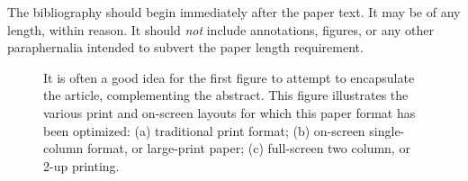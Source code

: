 \documentclass[extendedabs]{recpad2k}
\def\etal{\emph{et al}\bmvaOneDot}
\begin{document}
The bibliography should begin immediately after the paper text.  It may
be of any length, within reason.  It should {\em not} include
annotations, figures, or any other paraphernalia intended to subvert the
paper length requirement.

\begin{figure}
\caption{It is often a good idea for the first figure to attempt to
encapsulate the article, complementing the abstract.  This figure illustrates
the various print and on-screen layouts for which this paper format has
been optimized: (a) traditional print format; (b) on-screen
single-column format, or large-print paper; (c) full-screen two column, or
2-up printing. }
\end{figure}






\end{document}
